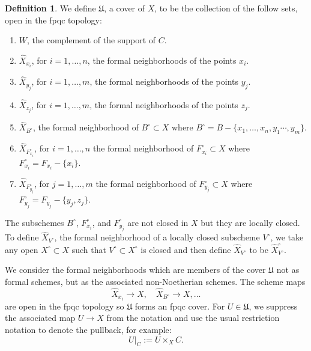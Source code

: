 \documentclass{amsart}
\theoremstyle{definition}
\newtheorem{definition}[theorem]{Definition}
\newcommand{\Xhat}{\widehat{X}}
\begin{document}
\begin{definition}\label{defn: the fpqc cover mathfrak U}
We define $\mathfrak{U}$, a cover of $X$, to be the collection of the
follow sets, open in the fpqc topology:\begin{enumerate}
\item $W$, the complement of the support of $C$.
\item $\Xhat_{x_{i}}$, for $i=1,\dotsc ,n$, the formal neighborhoods
of the points $x_{i}$.
\item $\Xhat_{y_{j}}$, for $i=1,\dotsc ,m$, the formal neighborhoods
of the points $y_{j}$.
\item $\Xhat_{z_{j}}$, for $i=1,\dotsc ,m$, the formal neighborhoods
of the points $z_{j}$.
\item $\Xhat_{B^{\circ}}$, the formal neighborhood of
$B^{\circ}\subset X$ where $B^{\circ}=B-\{x_{1},\dotsc
,x_{n},y_{1}\dotsb ,y_{m} \}$. 
\item $\Xhat_{F_{x_{i}}^{\circ}}$, for $i=1,\dotsc ,n$ the formal neighborhood of
$F_{x_{i}}^{\circ}\subset X$ where $F_{x_{i}}^{\circ}=F_{x_{i}}-\{x_{i} \}$. 
\item $\Xhat_{F_{y_{j}}^{\circ}}$, for $j=1,\dotsc ,m$ the formal neighborhood of
$F_{y_{j}}^{\circ}\subset X$ where $F_{y_{j}}^{\circ}=F_{y_{j}}-\{y_{j},z_{j} \}$. 
\end{enumerate}
\end{definition}

The subschemes $B^{\circ}$, $F_{x_{i}}^{\circ}$, and
$F_{y_{j}}^{\circ}$ are not closed in $X$ but they are locally
closed. To define $\Xhat_{V^{\circ}}$, the formal neighborhood of a
locally closed subscheme $V^{\circ}$, we take any open
$X^{\circ}\subset X$ such that $V^{\circ}\subset X^{\circ}$ is closed
and then define $\Xhat_{V^{\circ}}$ to be $\Xhat^{\circ}_{V^{\circ}}$.

We consider the formal neighborhoods which are members of the cover
$\mathfrak{U}$ not as formal schemes, but as the associated
non-Noetherian schemes. The scheme maps
\[
\Xhat_{x_{i}}\to X, \quad \Xhat_{B^{\circ}}\to X, \dotsc 
\]
are open in the fpqc topology \cite[]{} so $\mathfrak{U}$ forms an
fpqc cover. For $U\in \mathfrak{U}$, we suppress the associated map
$U\to X$ from the notation and use the usual restriction notation to
denote the pullback, for example:
\[
U|_{C}:=U\times_{X}C. 
\]
\end{document}
